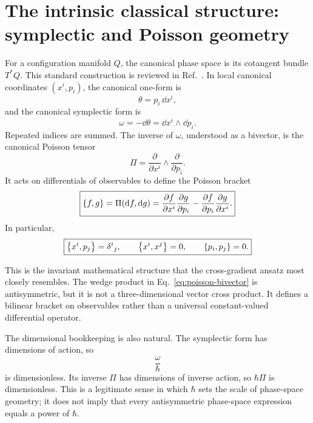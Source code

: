 \section{The intrinsic classical structure: symplectic and Poisson geometry}

For a configuration manifold \(Q\), the canonical phase space is its cotangent bundle \(T^*Q\). This standard construction is reviewed in Ref.~\cite{RoubtsovDutykh}. In local canonical coordinates \((x^i,p_i)\), the canonical one-form is
\begin{equation}
\theta=p_i\,\dd x^i,
\end{equation}
and the canonical symplectic form is
\begin{equation}
\boxed{
\omega=-\dd\theta=\dd x^i\wedge\dd p_i.
}
\label{eq:symplectic}
\end{equation}
Repeated indices are summed. The inverse of \(\omega\), understood as a bivector, is the canonical Poisson tensor
\begin{equation}
\boxed{
\Pi
=
\frac{\partial}{\partial x^i}
\wedge
\frac{\partial}{\partial p_i}.
}
\label{eq:poisson-bivector}
\end{equation}
It acts on differentials of observables to define the Poisson bracket
\begin{equation}
\boxed{
\left\{f,g\right\}
=
\Pi(\mathrm{d} f,\mathrm{d} g)
=
\frac{\partial f}{\partial x^i}
\frac{\partial g}{\partial p_i}
-
\frac{\partial f}{\partial p_i}
\frac{\partial g}{\partial x^i}.
}
\label{eq:poisson}
\end{equation}
In particular,
\begin{equation}
\boxed{
\left\{x^i,p_j\right\}=\delta^i{}_j,
\qquad
\left\{x^i,x^j\right\}=0,
\qquad
\left\{p_i,p_j\right\}=0.
}
\label{eq:canonical-pb}
\end{equation}

This is the invariant mathematical structure that the cross-gradient ansatz most closely resembles. The wedge product in Eq.~\eqref{eq:poisson-bivector} is antisymmetric, but it is not a three-dimensional vector cross product. It defines a bilinear bracket on observables rather than a universal constant-valued differential operator.

The dimensional bookkeeping is also natural. The symplectic form has dimensions of action, so
\begin{equation}
\frac{\omega}{\hbar}
\end{equation}
is dimensionless. Its inverse \(\Pi\) has dimensions of inverse action, so \(\hbar\Pi\) is dimensionless. This is a legitimate sense in which \(\hbar\) sets the scale of phase-space geometry; it does not imply that every antisymmetric phase-space expression equals a power of \(\hbar\).
